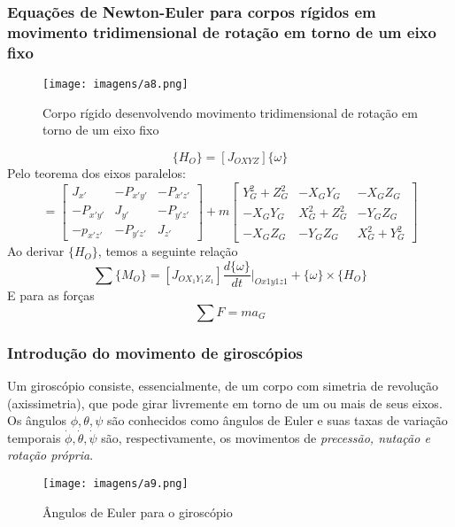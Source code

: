 \documentclass[a4paper, 12pt]{article}
\begin{document}
	\subsubsection{Equações de Newton-Euler para corpos rígidos em movimento tridimensional de rotação em torno de um eixo fixo}
		\begin{figure}[h]
			\center
			\texttt{[image: imagens/a8.png]} 
			\caption{Corpo rígido desenvolvendo movimento tridimensional de rotação em torno de um eixo fixo}
		\end{figure}
		\begin{equation}
			\{H_O\} = [J_{OXYZ}]\{\omega \}
		\end{equation}
		Pelo teorema dos eixos paralelos:
		\begin{equation}
			[J_{OXYZ}] = \begin{bmatrix}
			J_{x'} & -P_{x'y'} & -P_{x'z'}\\
			-P_{x'y'} & J_{y'} & -P_{y'z'}\\
			-p_{x'z'} & -P_{y'z'} & J_{z'}
			\end{bmatrix} + m\begin{bmatrix}
			 Y_G^2 + Z^2_G & -X_GY_G & -X_GZ_G\\
			 -X_GY_G & X^2_G+Z^2_G & -Y_GZ_G\\
			 -X_GZ_G & -Y_GZ_G & X^2_G + Y_G^2
			\end{bmatrix}
		\end{equation}
		Ao derivar $\{H_O\}$, temos a seguinte relação
		\begin{equation}
			\sum \{M_O\} = [J_{OX_1Y_1Z_1}]\frac{d\{\omega \}}{dt}|_{Ox1y1z1} + \{\omega \} \times \{H_O\}
		\end{equation}
		E para as forças
		\begin{equation}
			\sum F = ma_G
		\end{equation}

		\subsubsection{Introdução do movimento de giroscópios}
		Um giroscópio consiste, essencialmente, de um corpo com simetria de revolução (axissimetria), que pode girar livremente em torno de um ou mais de seus eixos.\\
		
		Os ângulos $\phi , \theta , \psi$ são conhecidos como ângulos de Euler e suas taxas de variação temporais  $\dot{\phi} , \dot{\theta} , \dot{\psi}$ são, respectivamente, os movimentos de \textit{precessão, nutação e rotação própria}.
		\begin{figure}[h]
			\center
			\texttt{[image: imagens/a9.png]} 
			\caption{Ângulos de Euler para o giroscópio}
		\end{figure}
		
\end{document}
